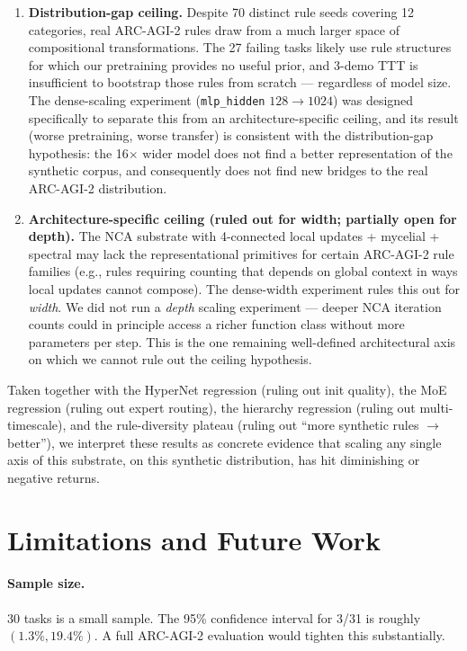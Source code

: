 \documentclass[11pt]{article}
\begin{document}
\begin{enumerate}
    \item \textbf{Distribution-gap ceiling.} Despite 70 distinct rule seeds covering 12 categories, real ARC-AGI-2 rules draw from a much larger space of compositional transformations. The 27 failing tasks likely use rule structures for which our pretraining provides no useful prior, and 3-demo TTT is insufficient to bootstrap those rules from scratch --- regardless of model size. The dense-scaling experiment (\texttt{mlp\_hidden} $128 \to 1024$) was designed specifically to separate this from an architecture-specific ceiling, and its result (worse pretraining, worse transfer) is consistent with the distribution-gap hypothesis: the 16$\times$ wider model does not find a better representation of the synthetic corpus, and consequently does not find new bridges to the real ARC-AGI-2 distribution.
    \item \textbf{Architecture-specific ceiling (ruled out for width; partially open for depth).} The NCA substrate with 4-connected local updates + mycelial + spectral may lack the representational primitives for certain ARC-AGI-2 rule families (e.g., rules requiring counting that depends on global context in ways local updates cannot compose). The dense-width experiment rules this out for \emph{width}. We did not run a \emph{depth} scaling experiment --- deeper NCA iteration counts could in principle access a richer function class without more parameters per step. This is the one remaining well-defined architectural axis on which we cannot rule out the ceiling hypothesis.
\end{enumerate}

Taken together with the HyperNet regression (ruling out init quality), the MoE regression (ruling out expert routing), the hierarchy regression (ruling out multi-timescale), and the rule-diversity plateau (ruling out ``more synthetic rules $\to$ better''), we interpret these results as concrete evidence that scaling any single axis of this substrate, on this synthetic distribution, has hit diminishing or negative returns.

\section{Limitations and Future Work}

\paragraph{Sample size.} 30 tasks is a small sample. The 95\% confidence interval for 3/31 is roughly $(1.3\%, 19.4\%)$. A full ARC-AGI-2 evaluation would tighten this substantially.
\end{document}
